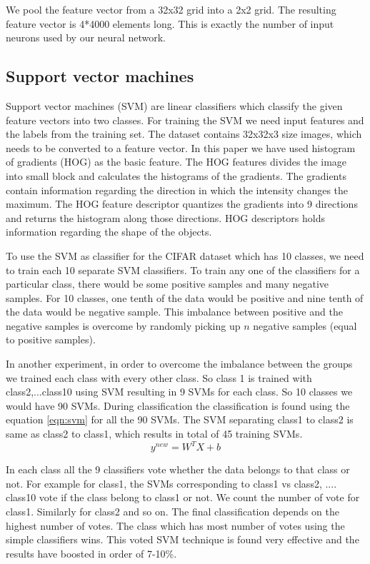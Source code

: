 \documentclass{article} %
\begin{document}
        We pool the feature vector from a 32x32 grid into a 2x2 grid. The resulting feature vector is 4*4000 elements long. This is exactly the number of input neurons used by our neural network.

\subsection{Support vector machines}
\label{sec:svm}
	Support vector machines (SVM) are linear classifiers which classify the given feature vectors into two classes. For training the SVM we need input features and the labels from the training set. The dataset contains 32x32x3 size images, which needs to be converted to a feature vector. In this paper we have used histogram of gradients (HOG) as the basic feature. The HOG features divides the image into small block and calculates the histograms of the gradients. The gradients contain information regarding the direction in which the intensity changes the maximum. The HOG feature descriptor quantizes the gradients into 9 directions and returns the histogram along those directions. HOG descriptors holds information regarding the shape of the objects.
	
	To use the SVM as classifier for the CIFAR dataset which has 10 classes, we need to train each 10 separate SVM classifiers. To train any one of the classifiers for a particular class, there would be some positive samples and many negative samples. For 10 classes, one tenth of the data would be positive and nine tenth of the data would be negative sample. This imbalance between positive and the negative samples is overcome by randomly picking up  $n$ negative samples (equal to positive samples).
	
	In another experiment, in order to overcome the imbalance between the groups we trained each class with every other class. So class 1 is trained with class2,...class10 using SVM resulting in 9 SVMs for each class. So 10 classes we would have 90 SVMs. During classification the classification is found using the equation \ref{eqn:svm} for all the 90 SVMs. The SVM separating class1 to class2 is same as class2 to class1, which results in total of 45 training SVMs.
	\begin{equation}
	\label{eqn:svm}
		y^{new} = W^T X + b	
	\end{equation}
	
In each class all the 9 classifiers vote whether the data belongs to that class or not. For example for class1, the SVMs corresponding to class1 vs class2, .... class10 vote if the class belong to class1 or not. We count the number of vote for class1. Similarly for class2 and so on. The final classification depends on the highest number of votes. The class which has most number of votes using the simple classifiers wins. This voted SVM technique is found very effective and the results have boosted in order of 7-10\%.
\end{document}
